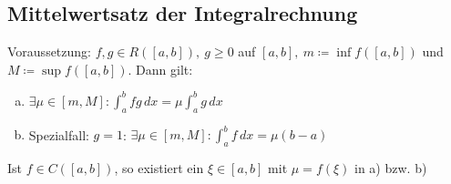 \subsection{Mittelwertsatz der Integralrechnung}
Voraussetzung: $f,g \in R([a,b]),\ g \geq 0$ auf $[a,b],\ m \coloneqq \inf f([a,b])$ und $M \coloneqq \sup f([a,b])$. Dann gilt:
\begin{enumerate} [a)]
    \item $\exists \mu \in [m,M]: \int_a^b fg\,dx = \mu \int_a^b g\,dx$
    \item Spezialfall: $g = 1$: $\exists \mu \in [m,M]: \int_a^b f\,dx = \mu (b-a)$
\end{enumerate}
Ist $f \in C([a,b])$, so existiert ein $\xi \in [a,b]$ mit $\mu = f(\xi)$ in a) bzw. b)